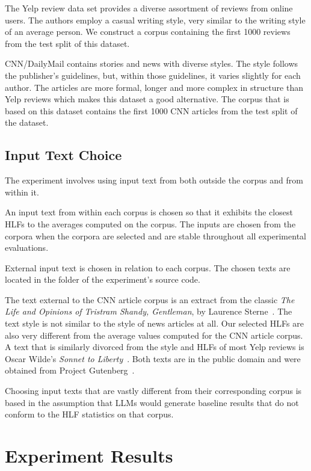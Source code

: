 \documentclass[a4paper,twoside]{article}
\begin{document}
The Yelp review data set provides a diverse assortment of reviews from online
users.
The authors employ a casual writing style, very similar to the writing style of
an average person.
We construct a corpus containing the first 1000 reviews from the test split of
this dataset.

CNN/DailyMail contains stories and news with diverse styles.
The style follows the publisher's guidelines, but, within those guidelines, it
varies slightly for each author.
The articles are more formal, longer and more complex in structure than Yelp
reviews which makes this dataset a good alternative.
The corpus that is based on this dataset contains the first 1000 CNN articles
from the test split of the dataset.

\subsection{Input Text Choice}\label{input-text}

The experiment involves using input text from both outside the corpus and from
within it.

An input text from within each corpus is chosen so that it exhibits the closest
HLFs to the averages computed on the corpus.
The inputs are chosen from the corpora when the corpora are selected and are
stable throughout all experimental evaluations.

External input text is chosen in relation to each corpus.
The chosen texts are located in the
\texttt{}
folder of the experiment's source code.

The text external to the CNN article corpus is an extract from the classic
\textit{The Life and Opinions of Tristram Shandy, Gentleman}, by Laurence
Sterne~\cite{sterne2003life}.
The text style is not similar to the style of news articles at all.
Our selected HLFs are also very different from the average values computed for
the CNN article corpus.
A text that is similarly divorced from the style and HLFs of most Yelp reviews
is Oscar Wilde's \textit{Sonnet to Liberty}~\cite{wilde1909poems}.
Both texts are in the public domain and were obtained from Project
Gutenberg~\cite{gutenberg}.

Choosing input texts that are vastly different from their corresponding corpus
is based in the assumption that LLMs would generate baseline results that do not
conform to the HLF statistics on that corpus.

\section{Experiment Results}
\end{document}
